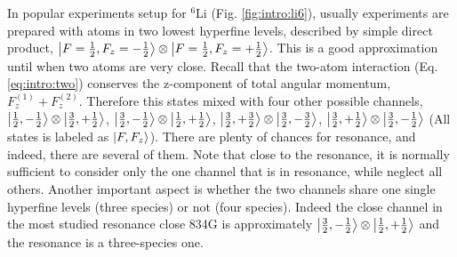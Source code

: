 In popular experiments setup for $^{6}$Li (Fig. \ref{fig:intro:li6}), usually experiments are prepared with atoms in two lowest hyperfine levels, described by simple direct product, $\left|F=\frac{1}{2},F_{z}=-\frac{1}{2}\right>\otimes\left|F=\frac{1}{2},F_{z}=+\frac{1}{2}\right>$.  This is a good approximation until when two atoms are very close.  Recall that the two-atom interaction (Eq. \ref{eq:intro:two}) conserves the z-component of total angular momentum, $F_{z}^{(1)}+F_{z}^{(2)}$.  Therefore this states mixed with four other possible channels, $\left|\frac{1}{2},-\frac{1}{2}\right>\otimes\left|\frac{3}{2},+\frac{1}{2}\right>$, $\left|\frac{3}{2},-\frac{1}{2}\right>\otimes\left|\frac{1}{2},+\frac{1}{2}\right>$, $\left|\frac{3}{2},+\frac{3}{2}\right>\otimes\left|\frac{3}{2},-\frac{3}{2}\right>$, $\left|\frac{3}{2},+\frac{1}{2}\right>\otimes\left|\frac{3}{2},-\frac{1}{2}\right>$ (All states is labeled as $\left|F,F_{z}\right>$).  There are plenty of chances for resonance, and indeed, there are several of them.  Note that close to the resonance, it is normally sufficient to consider only the one channel that is in resonance, while neglect all others.  Another important aspect is whether the two channels share one single hyperfine levels (three species) or not (four species).   Indeed the close channel in the most studied resonance close 834G is approximately $\left|\frac{3}{2},-\frac{1}{2}\right>\otimes\left|\frac{1}{2},+\frac{1}{2}\right>$ and the resonance is a three-species one\cite{ZhangThesis,ChengRMP}. 

